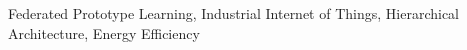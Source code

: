 \documentclass[journal]{IEEEtran}
\begin{document}
\begin{abstract}
\end{abstract}

\begin{IEEEkeywords}
  Federated Prototype Learning, Industrial Internet of Things, Hierarchical Architecture, Energy Efficiency
\end{IEEEkeywords}
\end{document}
